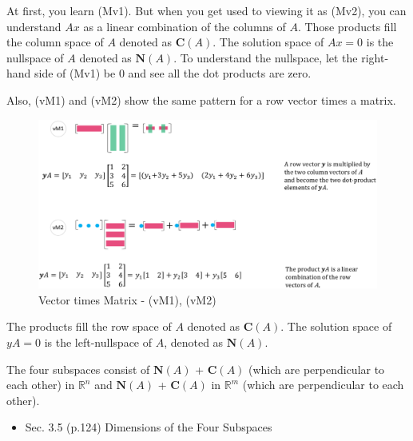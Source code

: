\documentclass{article}
\begin{document}
At first, you learn (Mv1). But when you get used to viewing it as (Mv2),
you can understand $A{x}$ as a linear combination of the columns of $A$.
Those products fill the column space of $A$  denoted as $\mathbf{C}(A)$.
The solution space of $A{x}={0}$ is the nullspace of $A$ denoted as $\mathbf{N}(A)$.
To understand the nullspace, let the right-hand side of (Mv1) be $0$
and see all the dot products are zero.

Also, (vM1) and (vM2) show the same pattern for a row vector times a matrix.

\begin{figure}[H]
  \centering
  \includegraphics[scale=0.6]{../figz/VectorTimesMatrix}
  \caption{Vector times Matrix - (vM1), (vM2)}
\end{figure}


The products fill the row space of $A$ denoted as $\mathbf{C}(A)$.
The solution space of $yA=0$ is the left-nullspace of $A$, denoted as $\mathbf{N}(A)$.


The four subspaces consist of $\mathbf{N}(A)$ + $\mathbf{C}(A)$
(which are perpendicular to each other) in $\mathbb{R}^n$ and
$\mathbf{N}(A)$ + $\mathbf{C}(A)$ in $\mathbb{R}^m$
(which are perpendicular to each other).


\begin{itemize}
  \item Sec. 3.5 (p.124) Dimensions of the Four Subspaces
\end{itemize}
\end{document}
